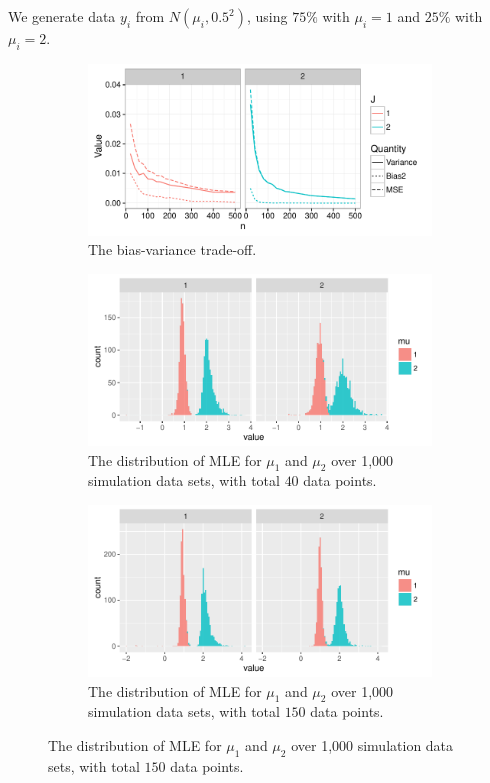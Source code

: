 \documentclass[12pt]{article}
\begin{document}
We generate data $y_i$ from $N(\mu_i, 0.5^2)$, using $75\%$ with $\mu_i =1$ and $25\%$ with $\mu_i =2$.

\begin{figure}[H]
\centering
\begin{subfigure}[t]{.8\columnwidth}
\includegraphics[width=\textwidth]{BV2.pdf}
\caption{The bias-variance trade-off.}
\end{subfigure}
\begin{subfigure}[t]{.8\columnwidth}
\includegraphics[width=\textwidth]{BVMeanDist.pdf}
\caption{The distribution of MLE for $\mu_1$ and $\mu_2$ over 1,000 simulation data sets, with total $40$ data points.}
\end{subfigure}
\begin{subfigure}[t]{.8\columnwidth}
\includegraphics[width=\textwidth]{BVMeanDist3.pdf}
\caption{The distribution of MLE for $\mu_1$ and $\mu_2$ over 1,000 simulation data sets, with total $150$ data points.}
\end{subfigure}
\end{figure}
\end{document}
